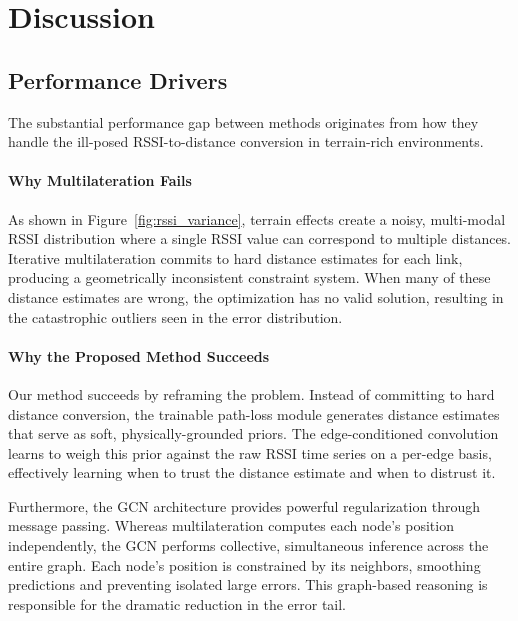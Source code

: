 \documentclass[master,final,11pt]{iscs-thesis}
\begin{document}
\section{Discussion}
\label{sec:infra_discussion}

\subsection{Performance Drivers}

The substantial performance gap between methods originates from how they handle the ill-posed RSSI-to-distance conversion in terrain-rich environments.

\paragraph{Why Multilateration Fails}
As shown in Figure~\ref{fig:rssi_variance}, terrain effects create a noisy, multi-modal RSSI distribution where a single RSSI value can correspond to multiple distances.
Iterative multilateration commits to hard distance estimates for each link, producing a geometrically inconsistent constraint system.
When many of these distance estimates are wrong, the optimization has no valid solution, resulting in the catastrophic outliers seen in the error distribution.

\paragraph{Why the Proposed Method Succeeds}
Our method succeeds by reframing the problem.
Instead of committing to hard distance conversion, the trainable path-loss module generates distance estimates that serve as soft, physically-grounded priors.
The edge-conditioned convolution learns to weigh this prior against the raw RSSI time series on a per-edge basis, effectively learning when to trust the distance estimate and when to distrust it.

Furthermore, the GCN architecture provides powerful regularization through message passing.
Whereas multilateration computes each node's position independently, the GCN performs collective, simultaneous inference across the entire graph.
Each node's position is constrained by its neighbors, smoothing predictions and preventing isolated large errors.
This graph-based reasoning is responsible for the dramatic reduction in the error tail.
\end{document}
